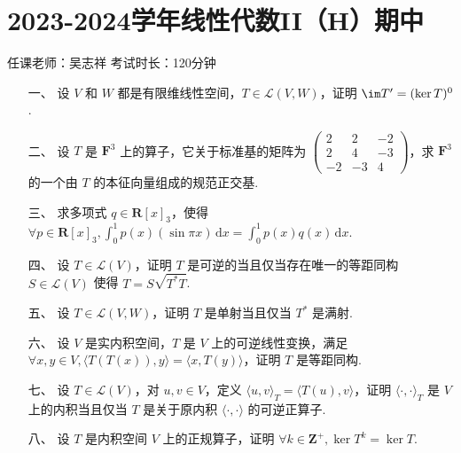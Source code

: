 \section*{2023-2024学年线性代数II（H）期中}

\begin{center}
    任课老师：吴志祥\hspace{4em} 考试时长：120分钟
\end{center}

\begin{enumerate}
	\item[一、]设 $V$ 和 $W$ 都是有限维线性空间，$T \in \mathcal{L}(V, W)$，证明 $\im T' = (\ker T)^{0}$.

    \item[二、]设 $T$ 是 $\mathbf{F}^3$ 上的算子，它关于标准基的矩阵为 $\begin{pmatrix}
        2 & 2 & -2 \\ 2 & 4 & -3 \\ -2 & -3 & 4
    \end{pmatrix}$，求 $\mathbf{F}^3$ 的一个由 $T$ 的本征向量组成的规范正交基.

	\item[三、]求多项式 $q \in \mathbf{R}[x]_3$，使得 $\forall p \in \mathbf{R}[x]_3, \int_{0}^{1}p(x)(\sin \pi x)\,\mathrm{d}x = \int_{0}^{1}p(x)q(x)\,\mathrm{d}x$.

	\item[四、]设 $T \in \mathcal{L}(V)$，证明 $T$ 是可逆的当且仅当存在唯一的等距同构 $S \in \mathcal{L}(V)$ 使得 $T = S \sqrt{T^{*}T}$.

    \item[五、]设 $T \in \mathcal{L}(V, W)$，证明 $T$ 是单射当且仅当 $T^{*}$ 是满射.

    \item[六、]设 $V$ 是实内积空间，$T$ 是 $V$ 上的可逆线性变换，满足 $\forall x, y \in V, \langle T(T(x)), y \rangle = \langle x, T(y) \rangle$，证明 $T$ 是等距同构.

    \item[七、]设 $T \in \mathcal{L}(V)$，对 $u, v \in V$，定义 $\langle u, v \rangle_{T} = \langle T(u), v \rangle$，证明 $\langle \cdot, \cdot \rangle_{T}$ 是 $V$ 上的内积当且仅当 $T$ 是关于原内积 $\langle \cdot, \cdot \rangle$ 的可逆正算子.

    \item[八、]设 $T$ 是内积空间 $V$ 上的正规算子，证明 $\forall k \in \mathbf{Z}^{+}, \ker T^{k} = \ker T$.


\end{enumerate}
